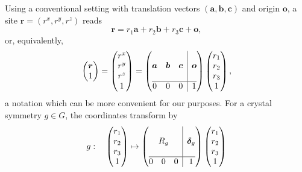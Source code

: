 \documentclass[12pt, a4paper]{article}
\begin{document}
Using a conventional setting with translation vectors $(\bm{a},\bm{b},\bm{c})$ and origin $\bm{o}$, a site $\bm{r}=(r^x,r^y,r^z)$  reads
\begin{equation}
  \bm{r}=r_1 \bm{a}+r_2 \bm{b}+r_3 \bm{c}+\bm{o},
\end{equation} 
or, equivalently,
\begin{equation}
  \begin{pmatrix}
    \bm{r}\\
    1
  \end{pmatrix}
  =
  \begin{pmatrix}
    r^x\\
    r^y\\
    r^z\\
    1
  \end{pmatrix}
  =
  \left(
  \begin{array}{@{}ccc|c@{}}
    \phantom{0}&&&\\
    \bm{a}&
    \bm{b}&
    \bm{c}&
    \bm{o}\\
    \phantom{0}&&&\\
    \hline
    0&0&0&1
  \end{array}
  \right)
  \begin{pmatrix}
    r_1\\
    r_2\\
    r_3\\
    1
  \end{pmatrix},
\end{equation} 
a notation which can be more convenient for our purposes. For a crystal symmetry $g\in G$, the coordinates transform by
\begin{equation}
  g:\quad
  \begin{pmatrix}
    r_1\\
    r_2\\
    r_3\\
    1
  \end{pmatrix}
  \mapsto
  \left(
  \begin{array}{@{}c|c@{}}
    \begin{matrix}
      \phantom{0} \\
      R_g \\
      \phantom{0} 
    \end{matrix}&\bm{\delta}_g\\
    \hline
    \begin{matrix}
      0&0&0
    \end{matrix}&1
  \end{array}
  \right)
  \begin{pmatrix}
    r_1\\
    r_2\\
    r_3\\
    1
  \end{pmatrix}
\end{equation}
\end{document}
